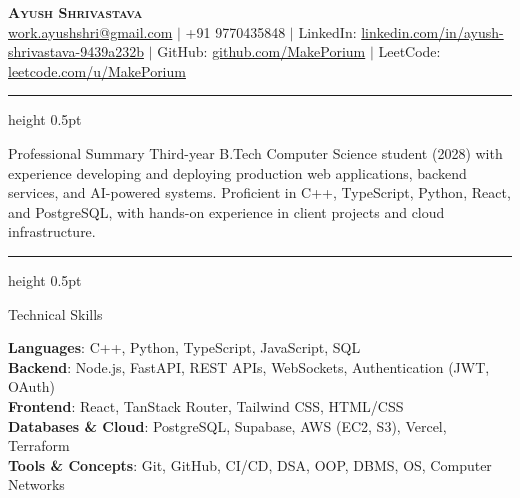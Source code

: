 \documentclass[letterpaper,10pt]{article}
\makeatletter
\renewcommand{\section}{\@ifstar\@sectionStar\@sectionNoStar}
\newcommand{\@sectionStar}[1]{%
  \par\vspace{4.5pt}%
  {\large\bfseries\scshape #1}%
  \par\vspace{2.5pt}%
  \hrule height 0.5pt%
  \par\vspace{3.5pt}%
}
\newcommand{\@sectionNoStar}[1]{%
  \par\vspace{4.5pt}%
  {\large\bfseries\scshape #1}%
  \par\vspace{2.5pt}%
  \hrule height 0.5pt%
  \par\vspace{3.5pt}%
}
\makeatother
\begin{document}
\begin{center}
    {\LARGE \scshape \textbf{Ayush Shrivastava}} \\ \vspace{3pt}
    \small 
    \href{mailto:work.ayushshri@gmail.com}{work.ayushshri@gmail.com} \quad$|$\quad
    +91 9770435848 \quad$|$\quad
    LinkedIn: \href{https://www.linkedin.com/in/ayush-shrivastava-9439a232b/}{linkedin.com/in/ayush-shrivastava-9439a232b} \quad$|$\quad
    GitHub: \href{https://github.com/MakePorium}{github.com/MakePorium} \quad$|$\quad
    LeetCode: \href{https://leetcode.com/u/MakePorium/}{leetcode.com/u/MakePorium}
\end{center}
\vspace{-4pt}

\section{Professional Summary}
\small{Third-year B.Tech Computer Science student (2028) with experience developing and deploying production web applications, backend services, and AI-powered systems. Proficient in C++, TypeScript, Python, React, and PostgreSQL, with hands-on experience in client projects and cloud infrastructure.}

\section{Technical Skills}
\begin{itemize}[leftmargin=0.0in, label={}, topsep=1pt, itemsep=1.5pt]
    \small{\item{
     \textbf{Languages}{: C++, Python, TypeScript, JavaScript, SQL} \\ \vspace{1pt}
     \textbf{Backend}{: Node.js, FastAPI, REST APIs, WebSockets, Authentication (JWT, OAuth)} \\ \vspace{1pt}
     \textbf{Frontend}{: React, TanStack Router, Tailwind CSS, HTML/CSS} \\ \vspace{1pt}
     \textbf{Databases \& Cloud}{: PostgreSQL, Supabase, AWS (EC2, S3), Vercel, Terraform} \\ \vspace{1pt}
     \textbf{Tools \& Concepts}{: Git, GitHub, CI/CD, DSA, OOP, DBMS, OS, Computer Networks}
    }}
\end{itemize}
\vspace{-3pt}
\end{document}
